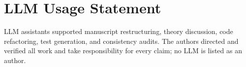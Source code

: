 \section{LLM Usage Statement}
\label{app:llm-usage}

LLM assistants supported manuscript restructuring, theory discussion, code
refactoring, test generation, and consistency audits. The authors directed and
verified all work and take responsibility for every claim; no LLM is listed as
an author.
